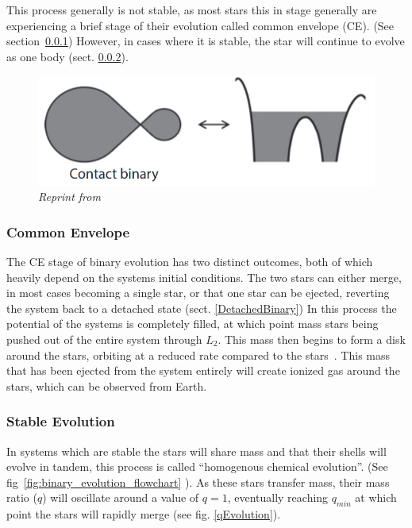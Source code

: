 \documentclass[12pt, a4paper]{article}
\begin{document}
        This process generally is not stable, as most stars this in stage generally are experiencing a brief stage of their evolution called common envelope (CE). (See section~\ref{CommonEnvelope}) However, in cases where it is stable, the star will continue to evolve as one body (sect. \ref{CommonEnvelopeStableEvoluton}).

        
        \begin{figure}
            \centering
            \includegraphics[scale = .4]{Figs/Conact Binary.png}

            \caption{\textit{Reprint from~\cite{TaurisvandenHeuvel+2023}}}
            \label{ContactBinaryRL}
        \end{figure}
        
        \subsubsection{Common Envelope}\label{CommonEnvelope}
            The CE stage of binary evolution has two distinct outcomes, both of which heavily depend on the systems initial conditions. The two stars can either merge, in most cases becoming a single star, or that one star can be ejected, reverting the system back to a detached state (sect. \ref{DetachedBinary}) In this process the potential of the systems is completely filled, at which point mass stars being pushed out of the entire system through $L_2$. This mass then begins to form a disk around the stars, orbiting at a reduced rate compared to the stars~\cite{TaurisvandenHeuvel+2023}. This mass that has been ejected from the system entirely will create ionized gas around the stars, which can be observed from Earth.~\cite{TaurisvandenHeuvel+2023}

        \subsubsection{Stable Evolution}\label{CommonEnvelopeStableEvoluton}
            In systems which are stable the stars will share mass and that their shells will evolve in tandem, this process is called ``homogenous chemical evolution''. (See fig~\ref{fig:binary_evolution_flowchart} \cite{Chen_2024}). As these stars transfer mass, their mass ratio ($q$) will oscillate around a value of $q=1$, eventually reaching $q_{min}$ at which point the stars will rapidly merge (see fig. \ref{qEvolution}). \cite{Pešta_2023}
            
\end{document}

